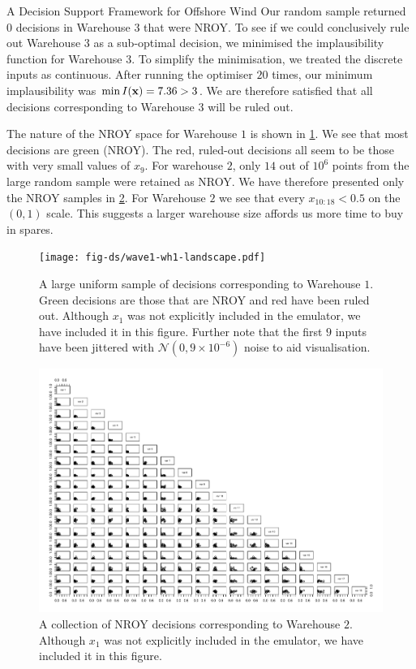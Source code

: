 \begin{chapter}{A Decision Support Framework for Offshore Wind \label{Ch:ds-for-ow}}
Our random sample returned $0$ decisions in Warehouse $3$ that were NROY. To see if we could conclusively rule out Warehouse $3$ as a sub-optimal decision, we minimised the implausibility function for Warehouse $3$. To simplify the minimisation, we treated the discrete inputs as continuous. After running the optimiser $20$ times, our minimum implausibility was $\min I(\mathbf{x}) = 7.36 > 3$. We are therefore satisfied that all decisions corresponding to Warehouse $3$ will be ruled out.

The nature of the NROY space for Warehouse $1$ is shown in \cref{Fig:wave1-w1-nroy}. We see that most decisions are green (NROY). The red, ruled-out decisions all seem to be those with very small values of $x_9$. For warehouse $2$, only $14$ out of $10^6$ points from the large random sample were retained as NROY. We have therefore presented only the NROY samples in \cref{Fig:wave1-w2-nroy}. For Warehouse $2$ we see that every $x_{10:18} < 0.5$ on the $(0,1)$ scale. This suggests a larger warehouse size affords us more time to buy in spares.
\begin{figure}
  \centering
  \texttt{[image: fig-ds/wave1-wh1-landscape.pdf]}
  \caption{A large uniform sample of decisions corresponding to Warehouse $1$. Green decisions are those that are NROY and red have been ruled out. Although $x_1$ was not explicitly included in the emulator, we have included it in this figure. Further note that the first $9$ inputs have been jittered with $\mathcal{N}(0, 9 \times 10^{-6})$ noise to aid visualisation. \label{Fig:wave1-w1-nroy}}
\end{figure}
\begin{figure}
  \centering
  \includegraphics[width = 8in, angle=270]{fig-ds/wave1-wh2-landscape.pdf}
  \caption{A collection of NROY decisions corresponding to Warehouse $2$. Although $x_1$ was not explicitly included in the emulator, we have included it in this figure.\label{Fig:wave1-w2-nroy}}
\end{figure}


\end{chapter}
